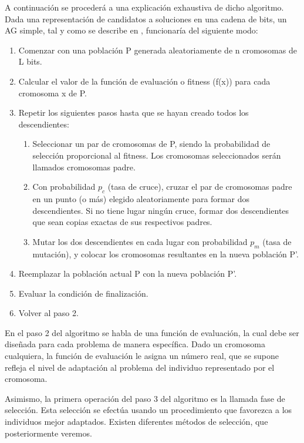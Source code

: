 \documentclass[runningheads]{llncs}
\begin{document}
A continuación se procederá a una explicación exhaustiva de dicho algoritmo.
Dada una representación de candidatos a soluciones en una cadena de bits, un AG simple, tal y como 
se describe en \cite{Mit98}, funcionaría del siguiente modo:

\begin{enumerate}
 \item Comenzar con una población P generada aleatoriamente de n cromosomas de L bits.
 \item Calcular el valor de la función de evaluación o fitness (f(x)) para cada cromosoma x de P.
 \item Repetir los siguientes pasos hasta que se hayan creado todos los  descendientes:
 \begin{enumerate}
    \item Seleccionar un par de cromosomas de P, siendo la probabilidad de selección proporcional al fitness.
    Los cromosomas seleccionados serán llamados cromosomas padre.
    \item Con probabilidad \textit{$p_c$} (tasa de cruce), cruzar el par de cromosomas padre en un punto (o más)
    elegido aleatoriamente para formar dos descendientes. Si no tiene lugar ningún cruce, formar dos descendientes que sean copias
    exactas de sus respectivos padres.
    \item Mutar los dos descendientes en cada lugar con probabilidad \textit{$p_m$} (tasa de mutación), y colocar 
    los cromosomas resultantes en la nueva población P'.
 \end{enumerate}
 \item Reemplazar la población actual P con la nueva población P'.
 \item Evaluar la condición de finalización.
 \item Volver al paso 2.

\end{enumerate}

En el paso 2 del algoritmo se habla de una función de evaluación, la cual debe ser diseñada para cada problema de manera 
específica. Dado un cromosoma cualquiera, la función de evaluación le asigna un número real, que se supone refleja el nivel de 
adaptación al problema del  individuo representado por el cromosoma. 

Asimismo, la primera operación del paso 3 del algoritmo es la llamada fase de selección. Esta selección se efectúa usando 
un procedimiento que favorezca a los individuos mejor adaptados. Existen diferentes métodos de selección, que posteriormente
veremos. 
\end{document}
